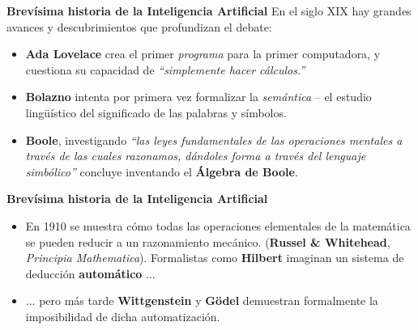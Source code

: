 \documentclass{beamer}
\begin{document}
\begin{frame}{\bfseries Brevísima historia de la Inteligencia Artificial}
En el siglo XIX hay grandes avances y descubrimientos que profundizan el debate:
\begin{itemize}
    \item \textbf{Ada Lovelace} crea el primer \textit{programa} para la primer computadora, y cuestiona su capacidad de \textit{``simplemente hacer cálculos.''}
    \item \textbf{Bolazno} intenta por primera vez formalizar la \textit{semántica} -- el estudio lingüístico del significado de las palabras y símbolos.
    \item \textbf{Boole}, investigando \textit{``las leyes fundamentales de las operaciones mentales a través de las cuales razonamos, dándoles forma a través del lenguaje simbólico''} concluye inventando el \textbf{Álgebra de Boole}.
\end{itemize}
\end{frame}

\begin{frame}{\bfseries Brevísima historia de la Inteligencia Artificial}
\begin{itemize}
    \item En 1910 se muestra cómo todas las operaciones elementales de la matemática se pueden reducir a un razonamiento mecánico. (\textbf{Russel \& Whitehead}, \textit{Principia Mathematica}). Formalistas como \textbf{Hilbert} imaginan un sistema de deducción \textbf{automático} ...
    \item<2-> ... pero más tarde \textbf{Wittgenstein} y \textbf{Gödel} demuestran formalmente la imposibilidad de dicha automatización.
\end{itemize}
\end{frame}
\end{document}

